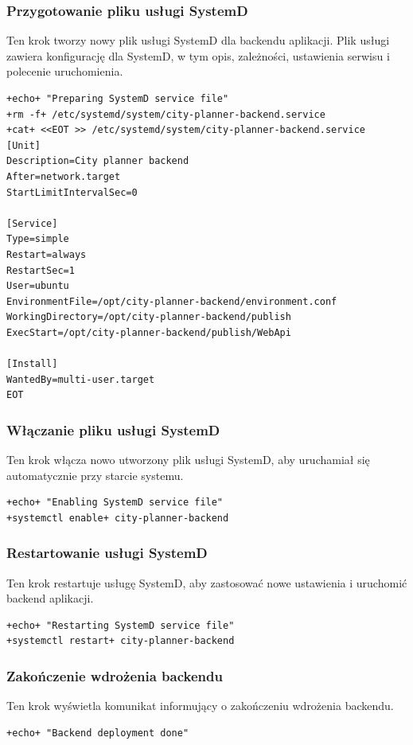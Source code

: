 \subsubsection{Przygotowanie pliku usługi SystemD}
Ten krok tworzy nowy plik usługi SystemD dla backendu aplikacji.
Plik usługi zawiera konfigurację dla SystemD, w tym opis, zależności, ustawienia serwisu i polecenie uruchomienia.

\begin{lstlisting}[style=shell-colored,label={lst:db3}]
+echo+ "Preparing SystemD service file"
+rm -f+ /etc/systemd/system/city-planner-backend.service
+cat+ <<EOT >> /etc/systemd/system/city-planner-backend.service
[Unit]
Description=City planner backend
After=network.target
StartLimitIntervalSec=0

[Service]
Type=simple
Restart=always
RestartSec=1
User=ubuntu
EnvironmentFile=/opt/city-planner-backend/environment.conf
WorkingDirectory=/opt/city-planner-backend/publish
ExecStart=/opt/city-planner-backend/publish/WebApi

[Install]
WantedBy=multi-user.target
EOT
\end{lstlisting}

\subsubsection{Włączanie pliku usługi SystemD}
Ten krok włącza nowo utworzony plik usługi SystemD, aby uruchamiał się automatycznie przy starcie systemu.
\begin{lstlisting}[style=shell-colored,label={lst:db4}]
+echo+ "Enabling SystemD service file"
+systemctl enable+ city-planner-backend
\end{lstlisting}

\subsubsection{Restartowanie usługi SystemD}
Ten krok restartuje usługę SystemD, aby zastosować nowe ustawienia i uruchomić backend aplikacji.
\begin{lstlisting}[style=shell-colored,label={lst:db5}]
+echo+ "Restarting SystemD service file"
+systemctl restart+ city-planner-backend
\end{lstlisting}

\subsubsection{Zakończenie wdrożenia backendu}
Ten krok wyświetla komunikat informujący o zakończeniu wdrożenia backendu.
\begin{lstlisting}[style=shell-colored,label={lst:db6}]
+echo+ "Backend deployment done"
\end{lstlisting}

